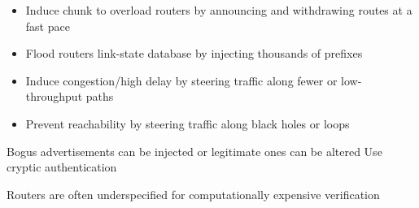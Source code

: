 \begin{itemize}
\begin{itemize}
\begin{itemize}
                    \item Induce chunk to overload routers by announcing and withdrawing routes at a fast pace
                    \item Flood routers link-state database by injecting thousands of prefixes
                    \item Induce congestion/high delay by steering traffic along fewer or low-throughput paths
                    \item Prevent reachability by steering traffic along black holes or loops
                \end{itemize}
        \end{itemize}
     Bogus advertisements can be injected or legitimate ones can be altered
     Use cryptic authentication
        \begin{itemize}
            \icon Routers are often underspecified for computationally expensive verification
        \end{itemize}
\end{itemize}


